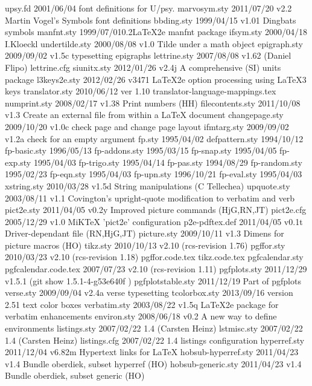     upsy.fd    2001/06/04 font definitions for U/psy.
marvosym.sty    2011/07/20 v2.2 Martin Vogel's Symbols font definitions
  bbding.sty    1999/04/15 v1.01 Dingbats symbols
  manfnt.sty    1999/07/010.2LaTeX2e manfnt package
   ifsym.sty    2000/04/18 I.Kloeckl
undertilde.sty    2000/08/08 v1.0 Tilde under a math object
epigraph.sty    2009/09/02 v1.5c typesetting epigraphs
lettrine.sty    2007/08/08 v1.62 (Daniel Flipo)
lettrine.cfg
 siunitx.sty    2012/01/26 v2.4j A comprehensive (SI) units package
l3keys2e.sty    2012/02/26 v3471 LaTeX2e option processing using LaTeX3 keys
translator.sty    2010/06/12 ver 1.10
translator-language-mappings.tex
numprint.sty    2008/02/17 v1.38 Print numbers (HH)
filecontents.sty    2011/10/08 v1.3 Create an external file from within a LaTeX document
changepage.sty    2009/10/20 v1.0c check page and change page layout
 ifmtarg.sty    2009/09/02 v1.2a check for an empty argument
      fp.sty    1995/04/02
defpattern.sty    1994/10/12
fp-basic.sty    1996/05/13
fp-addons.sty    1995/03/15
 fp-snap.sty    1995/04/05
  fp-exp.sty    1995/04/03
fp-trigo.sty    1995/04/14
  fp-pas.sty    1994/08/29
fp-random.sty    1995/02/23
  fp-eqn.sty    1995/04/03
  fp-upn.sty    1996/10/21
 fp-eval.sty    1995/04/03
 xstring.sty    2010/03/28  v1.5d  String manipulations (C Tellechea)
 upquote.sty    2003/08/11 v1.1 Covington's upright-quote modification to verbatim and verb
  pict2e.sty    2011/04/05 v0.2y Improved picture commands (HjG,RN,JT)
  pict2e.cfg    2005/12/29 v1.0 MiKTeX 'pict2e' configuration
p2e-pdftex.def    2011/04/05 v0.1t Driver-dependant file (RN,HjG,JT)
 picture.sty    2009/10/11 v1.3 Dimens for picture macros (HO)
    tikz.sty    2010/10/13 v2.10 (rcs-revision 1.76)
  pgffor.sty    2010/03/23 v2.10 (rcs-revision 1.18)
  pgffor.code.tex
    tikz.code.tex
pgfcalendar.sty    
pgfcalendar.code.tex    2007/07/23 v2.10 (rcs-revision 1.11)
pgfplots.sty    2011/12/29 v1.5.1 (git show 1.5.1-4-g53e640f )
pgfplotstable.sty    2011/12/19 Part of pgfplots
   verse.sty    2009/09/04 v2.4a verse typesetting
tcolorbox.sty    2013/09/16 version 2.51 text color boxes
verbatim.sty    2003/08/22 v1.5q LaTeX2e package for verbatim enhancements
 environ.sty    2008/06/18 v0.2 A new way to define environments
listings.sty    2007/02/22 1.4 (Carsten Heinz)
 lstmisc.sty    2007/02/22 1.4 (Carsten Heinz)
listings.cfg    2007/02/22 1.4 listings configuration
hyperref.sty    2011/12/04 v6.82m Hypertext links for LaTeX
hobsub-hyperref.sty    2011/04/23 v1.4 Bundle oberdiek, subset hyperref (HO)
hobsub-generic.sty    2011/04/23 v1.4 Bundle oberdiek, subset generic (HO)
